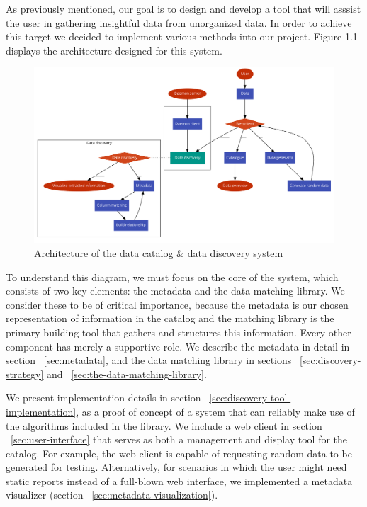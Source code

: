 As previously mentioned, our goal is to design and develop a tool that will asssist the user in gathering insightful data from unorganized data.
In order to achieve this target we decided to implement various methods into our project.
Figure 1.1 displays the architecture designed for this system.
\begin {figure} [h]
    \centering
    \includegraphics[width=16cm]{figures/architecture}
    \caption {Architecture of the data catalog \& data discovery system}
    \label {fig:architecture_diagram}
\end{figure}

To understand this diagram, we must focus on the core of the system, which consists of two key elements: the metadata and
the data matching library.
We consider these to be of critical importance, because the metadata is our chosen representation of information in the
catalog and the matching library is the primary building tool that gathers and structures this information.
Every other component has merely a supportive role.
We describe the metadata in detail in section ~\ref{sec:metadata}, and the data matching library in sections
~\ref{sec:discovery-strategy} and ~\ref{sec:the-data-matching-library}.

We present implementation details in section ~\ref{sec:discovery-tool-implementation}, as a proof of concept of a system
that can reliably make use of the algorithms included in the library.
We include a web client in section ~\ref{sec:user-interface} that serves as both a management and display tool for the catalog.
For example, the web client is capable of requesting random data to be generated for testing.
Alternatively, for scenarios in which the user might need static reports instead of a full-blown web interface, we implemented
a metadata visualizer (section ~\ref{sec:metadata-visualization}).

